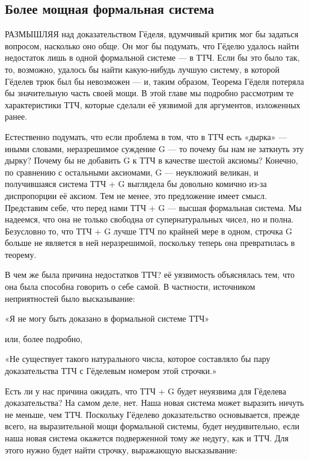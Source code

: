 \documentclass[../main.tex]{subfiles}
\begin{document}

\subsection{Более мощная формальная система}

РАЗМЫШЛЯЯ над доказательством Гёделя, вдумчивый критик мог бы задаться вопросом, насколько оно обще. Он мог бы подумать, что Гёделю удалось найти недостаток лишь в одной формальной системе --- в ТТЧ\@. Если бы это было так, то, возможно, удалось бы найти какую-нибудь лучшую систему, в которой Гёделев трюк был бы невозможен --- и, таким образом, Теорема Гёделя потеряла бы значительную часть своей мощи. В этой главе мы подробно рассмотрим те характеристики ТТЧ, которые сделали её уязвимой для аргументов, изложенных ранее.

Естественно подумать, что если проблема в том, что в ТТЧ есть «дырка» --- иными словами, неразрешимое суждение G --- то почему бы нам не заткнуть эту дырку? Почему бы не добавить G к ТТЧ в качестве шестой аксиомы? Конечно, по сравнению с остальными аксиомами, G --- неуклюжий великан, и получившаяся система ТТЧ + G выглядела бы довольно комично из-за диспропорции её аксиом. Тем не менее, это предложение имеет смысл. Представим себе, что перед нами ТТЧ + G --- высшая формальная система. Мы надеемся, что она не только свободна от супернатуральных чисел, но и полна. Безусловно то, что ТТЧ + G лучше ТТЧ по крайней мере в одном, строчка G больше не является в ней неразрешимой, поскольку теперь она превратилась в теорему.

В чем же была причина недостатков ТТЧ? её уязвимость объяснялась тем, что она была способна говорить о себе самой. В частности, источником неприятностей было высказывание:

«Я не могу быть доказано в формальной системе ТТЧ»

или, более подробно,

«Не существует такого натурального числа, которое составляло бы пару доказательства ТТЧ с Гёделевым номером этой строчки.»

Есть ли у нас причина ожидать, что ТТЧ + G будет неуязвима для Гёделева доказательства? На самом деле, нет. Наша новая система может выразить ничуть не меньше, чем ТТЧ\@. Поскольку Гёделево доказательство основывается, прежде всего, на выразительной мощи формальной системы, будет неудивительно, если наша новая система окажется подверженной тому же недугу, как и ТТЧ\@. Для этого нужно будет найти строчку, выражающую высказывание:
\end{document}
